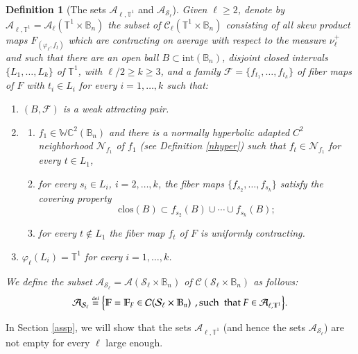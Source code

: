 \documentclass[11pt,reqno]{amsart}
\theoremstyle{plain}
\newtheorem{definition}[theorem]{Definition}
\newtheorem*{theorem A}{Theorem A}
\newtheorem*{theorem B}{Theorem B}
\newtheorem*{theorem C}{Theorem C}
\newtheorem*{theorem 1}{Theorem 1}
\newtheorem*{theorem 2}{Theorem 2}
\newtheorem*{theorem 3}{Theorem 3}
\newcommand{\eqdef}{\stackrel{\scriptscriptstyle\rm def}{=}}
\numberwithin{equation}{section}
\begin{document}
\begin{definition}[The sets $\mathcal{A}_{\ell, \mathbb{T}^1}$ and $\mathcal{A}_{\mathcal{S}_\ell}$]\label{ourconditions}
Given $\ell \ge 2$, denote by $\mathcal{A}_{\ell, \mathbb{T}^1} =\mathcal{A}_\ell (\mathbb{T}^1 \times \mathbb{B}_n)$ the subset of $\mathcal{C}_\ell(\mathbb{T}^1 \times \mathbb{B}_n)$ consisting of all skew product maps $F_{(\varphi_\ell, f_t)}$ which are contracting on average with respect to the measure $\nu^+_\ell$ and such that there are an open ball $B \subset \mathrm{int}(\mathbb{B}_n)$, disjoint closed intervals $\{L_{1}, \dots, L_{k}\}$ of $\mathbb{T}^1$, with $\ell/2 \ge k \ge 3$, and a family $\mathcal{F}=\{f_{t_1}, \dots, f_{t_k}\}$ of fiber maps of $F$ with $t_i\in L_i$ for every $i=1,\dots, k$ such that:
\begin{enumerate}
  \item [(A1)] $(B,\mathcal{F})$ is a weak attracting pair.
   \item [(A2)]
   \begin{enumerate}
    \item [(i)] $f_1\in\mathbb{WC}^2 ( \mathbb{B}_n)$ and there is a normally hyperbolic adapted $C^2$ neighborhood $\mathcal{N}_{f_1}$ of $f_1$ (see Definition \ref{nhyper}) such that $f_t \in \mathcal{N}_{f_1}$ for every $t \in L_1$,
      \item [(ii)] for every $s_i \in L_i$, $i=2, \ldots, k$, the fiber maps $\{f_{s_2}, \ldots, f_{s_k}\}$ satisfy the covering property
    $$
\mathrm{clos}(B)\subset f_{s_2}(B)\cup \cdots \cup f_{s_k}(B);
$$
\item[(iii)] for every $t\not\in L_1$ the fiber map $f_t$ of $F$ is uniformly contracting.
  \end{enumerate}
  \item [(A3)] $\varphi_\ell (L_i)=\mathbb{T}^1$ for every $i=1, \dots, k$.
     \end{enumerate}
We define the subset $\mathcal{A}_{\mathcal{S}_\ell} =\mathcal{A} (\mathcal{S}_\ell \times \mathbb{B}_n)$ of $\mathcal{C}(\mathcal{S}_\ell \times \mathbb{B}_n)$ as follows:
 $$
 \mathcal{A}_{\mathcal{S}_\ell} \eqdef \big\{\mathbb{F}=\mathbb{F}_{F} \in \mathcal{C}(\mathcal{S}_\ell \times \mathbb{B}_n) \,\ , \text{such \ that } F \in \mathcal{A}_{\ell ,\mathbb{T}^1}\big\}.
$$
\end{definition}

In Section \ref{assp}, we will show that the sets $\mathcal{A}_{\ell, \mathbb{T}^1}$ (and hence the sets $\mathcal{A}_{\mathcal{S}_\ell}$) are not empty for every $\ell$ large enough.
\end{document}
